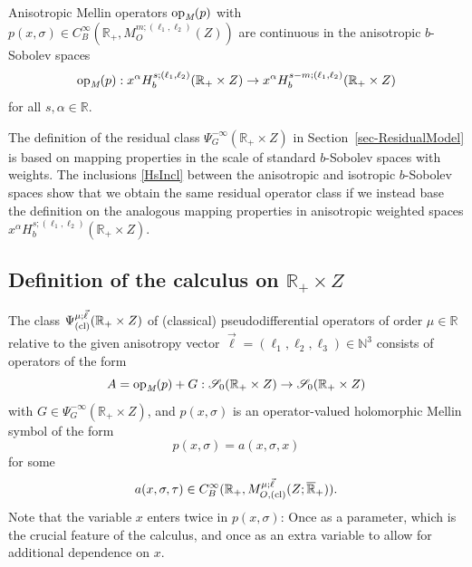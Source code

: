 \documentclass[reqno]{amsart}
\numberwithin{equation}{section}
\theoremstyle{definition}
\def\N{\mathbb N}
\def\R{\mathbb R}
\def\S{\mathscr S}
\def\opm{\textup{op}_{\textit{M}}}
\begin{document}
Anisotropic Mellin operators $\opm(p)$ with $p(x,\sigma) \in C^{\infty}_B(\R_+,M_O^{m;(\ell_1,\ell_2)}(Z))$ are continuous in the anisotropic $b$-Sobolev spaces
$$
\opm(p) : x^{\alpha}H_b^{s;(\ell_1,\ell_2)}(\R_+\times Z) \to x^{\alpha}H_b^{s-m;(\ell_1,\ell_2)}(\R_+\times Z)
$$
for all $s,\alpha \in \R$.

The definition of the residual class $\Psi^{-\infty}_G(\R_+\times Z)$ in Section~\ref{sec-ResidualModel} is based on mapping properties in the scale of standard $b$-Sobolev spaces with weights. The inclusions \eqref{HsIncl} between the anisotropic and isotropic $b$-Sobolev spaces show that we obtain the same residual operator class if we instead base the definition on the analogous mapping properties in anisotropic weighted spaces $x^{\alpha}H_b^{s;(\ell_1,\ell_2)}(\R_+\times Z)$.

\subsection{Definition of the calculus on {\boldmath $\R_+\times Z$}}

The class $\Psi^{\mu;\vec{\ell}}_{\textup{(cl)}}(\R_+\times Z)$ of (classical) pseudodifferential operators of order $\mu \in \R$ relative to the given anisotropy vector $\vec{\ell} = (\ell_1,\ell_2,\ell_3) \in \N^3$ consists of operators of the form
\begin{equation}\label{AModel}
A = \opm(p) + G : \S_0(\R_+\times Z) \to \S_0(\R_+ \times Z)
\end{equation}
with $G \in \Psi^{-\infty}_G(\R_+\times Z)$, and $p(x,\sigma)$ is an operator-valued holomorphic Mellin symbol of the form
$$
p(x,\sigma) = a(x,\sigma,x)
$$
for some
\begin{equation}\label{asymbol}
a(x,\sigma,\tau) \in C_B^{\infty}(\R_+,M_{O,\textup{(cl)}}^{\mu;\vec{\ell}}(Z;\overline{\R}_+)).
\end{equation}
Note that the variable $x$ enters twice in $p(x,\sigma)$: Once as a parameter, which is the crucial feature of the calculus, and once as an extra variable to allow for additional dependence on $x$.
\end{document}
